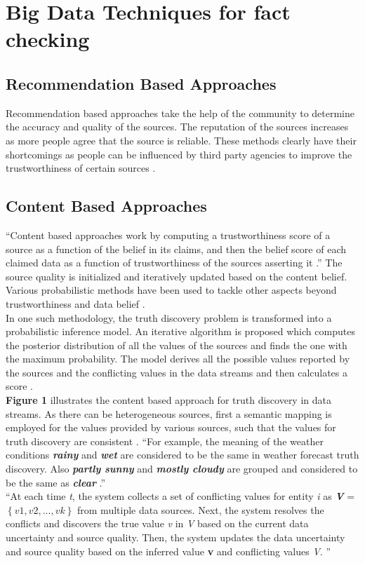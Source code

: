 \documentclass[sigconf]{acmart}
\begin{document}
\section{Big Data Techniques for fact checking}

\subsection{Recommendation Based Approaches}
Recommendation based approaches take the help of the community to determine the accuracy and quality of the sources. The reputation of the sources increases as more people agree that the source is reliable. These methods clearly have their shortcomings as people can be influenced by third party agencies to improve the trustworthiness of certain sources \cite{Berti-Equille2016}.

\subsection{Content Based Approaches}
``Content based approaches work by computing a trustworthiness score of a source as a function of the belief in its claims, and then the belief score of each claimed data as a function of trustworthiness of the sources asserting it \cite{Berti-Equille2016}.'' The source quality is initialized and iteratively updated based on the content belief. Various probabilistic methods have been used to tackle other aspects beyond trustworthiness and data belief \cite{Berti-Equille2016}. \\
In one such methodology, the truth discovery problem is transformed into a probabilistic inference model. An iterative algorithm is proposed which computes the posterior distribution of all the values of the sources and finds the one with the maximum probability. The model derives all the possible values reported by the sources and the conflicting values in the data streams and then calculates a score \cite{Zhao2014}. \\
\textbf{Figure 1} illustrates the content based approach for truth discovery in data streams. As there can be heterogeneous sources, first a semantic mapping is employed for the values provided by various sources, such that the values for truth discovery are consistent \cite{Zhao2014}. ``For example, the meaning of the weather conditions \textbf{\textit{rainy}} and \textbf{\textit{wet}} are considered to be the same in weather forecast truth discovery. Also \textbf{\textit{partly sunny}} and \textbf{\textit{mostly cloudy}} are grouped and considered to be the same as \textbf{\textit{clear}} \cite{Zhao2014}.'' \\
``At each time \textit{t}, the system collects a set of conflicting
values for entity \textit{i} as \textbf{\textit{V}} = $\left\{{v1,v2,...,vk}\right\}$ from multiple data sources. Next, the system resolves the conflicts and discovers the true value \textit{v} in \textit{V} based on the current data uncertainty and source
quality. Then, the system updates the data uncertainty and source quality based on the inferred value \textbf{v} and conflicting values \textit{V}. \cite{Zhao2014}''
\end{document}
